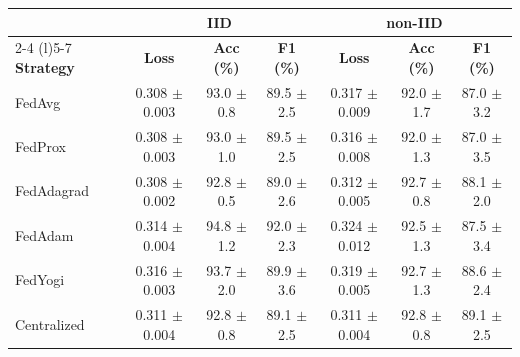 \begin{tabular}{l ccc ccc}
\toprule
 & \multicolumn{3}{c}{\textbf{IID}} & \multicolumn{3}{c}{\textbf{non-IID}} \\
\cmidrule(r){2-4} \cmidrule(l){5-7}
\textbf{Strategy} & \textbf{Loss} & \textbf{Acc (\%)} & \textbf{F1 (\%)} & \textbf{Loss} & \textbf{Acc (\%)} & \textbf{F1 (\%)} \\
\midrule
FedAvg & 0.308 $\pm$ 0.003 & 93.0 $\pm$ 0.8 & 89.5 $\pm$ 2.5 & 0.317 $\pm$ 0.009 & 92.0 $\pm$ 1.7 & 87.0 $\pm$ 3.2 \\
FedProx & 0.308 $\pm$ 0.003 & 93.0 $\pm$ 1.0 & 89.5 $\pm$ 2.5 & 0.316 $\pm$ 0.008 & 92.0 $\pm$ 1.3 & 87.0 $\pm$ 3.5 \\
FedAdagrad & 0.308 $\pm$ 0.002 & 92.8 $\pm$ 0.5 & 89.0 $\pm$ 2.6 & 0.312 $\pm$ 0.005 & 92.7 $\pm$ 0.8 & 88.1 $\pm$ 2.0 \\
FedAdam & 0.314 $\pm$ 0.004 & 94.8 $\pm$ 1.2 & 92.0 $\pm$ 2.3 & 0.324 $\pm$ 0.012 & 92.5 $\pm$ 1.3 & 87.5 $\pm$ 3.4 \\
FedYogi & 0.316 $\pm$ 0.003 & 93.7 $\pm$ 2.0 & 89.9 $\pm$ 3.6 & 0.319 $\pm$ 0.005 & 92.7 $\pm$ 1.3 & 88.6 $\pm$ 2.4 \\
Centralized & 0.311 $\pm$ 0.004 & 92.8 $\pm$ 0.8 & 89.1 $\pm$ 2.5 & 0.311 $\pm$ 0.004 & 92.8 $\pm$ 0.8 & 89.1 $\pm$ 2.5 \\
\bottomrule
\end{tabular}